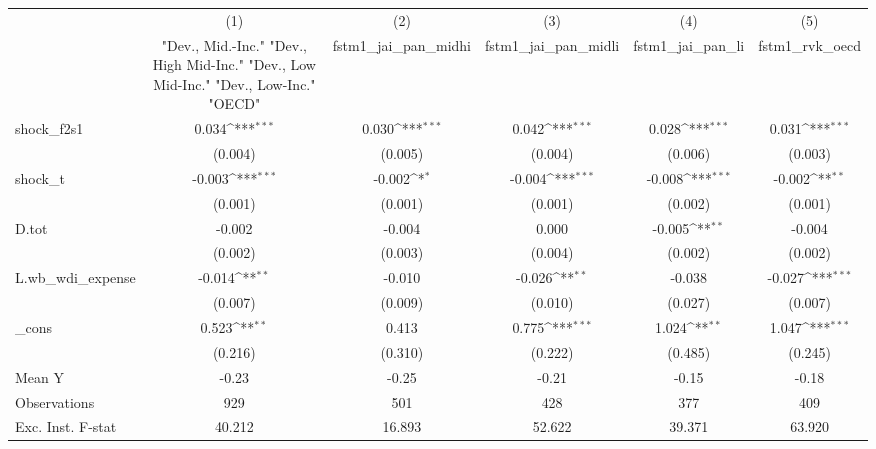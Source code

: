 {
\def\sym#1{\ifmmode^{#1}\else\(^{#1}\)\fi}
\begin{tabular}{l*{5}{c}}
\toprule
            &\multicolumn{1}{c}{(1)}&\multicolumn{1}{c}{(2)}&\multicolumn{1}{c}{(3)}&\multicolumn{1}{c}{(4)}&\multicolumn{1}{c}{(5)}\\
            &\multicolumn{1}{c}{ "Dev., Mid.-Inc." "Dev., High Mid-Inc." "Dev., Low Mid-Inc." "Dev., Low-Inc." "OECD" }&\multicolumn{1}{c}{fstm1\_jai\_pan\_midhi}&\multicolumn{1}{c}{fstm1\_jai\_pan\_midli}&\multicolumn{1}{c}{fstm1\_jai\_pan\_li}&\multicolumn{1}{c}{fstm1\_rvk\_oecd}\\
\midrule
shock\_f2s1  &       0.034\sym{***}&       0.030\sym{***}&       0.042\sym{***}&       0.028\sym{***}&       0.031\sym{***}\\
            &     (0.004)         &     (0.005)         &     (0.004)         &     (0.006)         &     (0.003)         \\
\addlinespace
shock\_t     &      -0.003\sym{***}&      -0.002\sym{*}  &      -0.004\sym{***}&      -0.008\sym{***}&      -0.002\sym{**} \\
            &     (0.001)         &     (0.001)         &     (0.001)         &     (0.002)         &     (0.001)         \\
\addlinespace
D.tot       &      -0.002         &      -0.004         &       0.000         &      -0.005\sym{**} &      -0.004         \\
            &     (0.002)         &     (0.003)         &     (0.004)         &     (0.002)         &     (0.002)         \\
\addlinespace
L.wb\_wdi\_expense&      -0.014\sym{**} &      -0.010         &      -0.026\sym{**} &      -0.038         &      -0.027\sym{***}\\
            &     (0.007)         &     (0.009)         &     (0.010)         &     (0.027)         &     (0.007)         \\
\addlinespace
\_cons      &       0.523\sym{**} &       0.413         &       0.775\sym{***}&       1.024\sym{**} &       1.047\sym{***}\\
            &     (0.216)         &     (0.310)         &     (0.222)         &     (0.485)         &     (0.245)         \\
\midrule
Mean Y      &       -0.23         &       -0.25         &       -0.21         &       -0.15         &       -0.18         \\
Observations&         929         &         501         &         428         &         377         &         409         \\
Exc. Inst. F-stat&      40.212         &      16.893         &      52.622         &      39.371         &      63.920         \\
\bottomrule
\end{tabular}
}
